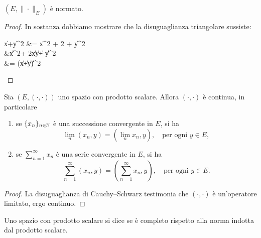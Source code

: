 \begin{lemma}
	 $(E, \|\cdot\|_E)$ è normato.
\end{lemma}
\begin{proof}
	In sostanza dobbiamo mostrare che la disuguaglianza triangolare sussiste:
	\begin{eqalign*}
		\|x+y\|^2 &= \|x\|^2 + 2  + \|y\|^2\\
		&\leq \|x\|^2+ 2\|x\|\|y\| + \|y\|^2\\
		&= (\|x\|+\|y\|)^2
	\end{eqalign*}
\end{proof}

\begin{lemma}
	Sia $(E, (\cdot,\cdot))$ uno spazio con prodotto scalare.
	Allora $(\cdot,\cdot)$ è continua, in particolare
	\begin{enumerate}
		\item se $\{x_n\}_{n \in \mathbb{N}}$ è una successione convergente in $E$, si ha
		\begin{equation*}
			\lim_n (x_n, y) = (\lim_n x_n, y), \quad \text{per ogni $y \in E$},
		\end{equation*}
		\item se $\sum_{n=1}^\infty x_n$ è una serie convergente in $E$, si ha
		\begin{equation*}
			\sum_{n=1}^\infty (x_n, y) = (\sum_{n=1}^\infty x_n, y), \quad \text{per ogni $y \in E$}.
		\end{equation*}
	\end{enumerate}
\end{lemma}
\begin{proof}
	La disuguaglianza di Cauchy--Schwarz testimonia che $(\cdot, \cdot)$ è un'operatore limitato, ergo continuo.
\end{proof}

\begin{definition}
	Uno spazio con prodotto scalare si dice  se è completo rispetto alla norma indotta dal prodotto scalare.
\end{definition}

